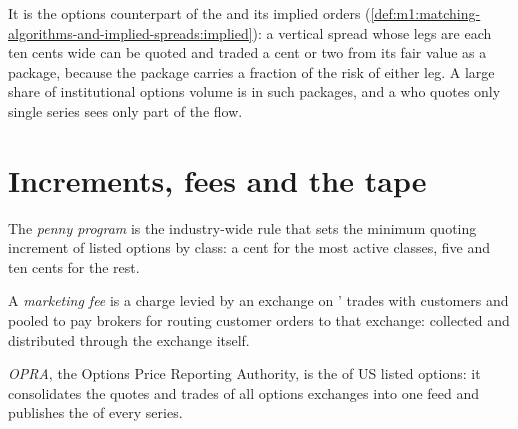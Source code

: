 It is the options counterpart of the  and its implied
orders (\cref{def:m1:matching-algorithms-and-implied-spreads:implied}): a
vertical spread whose legs are each ten cents wide can be quoted and traded a
cent or two from its fair value as a package, because the package carries a
fraction of the risk of either leg. A large share of institutional options
volume is in such packages, and a  who quotes only single series
sees only part of the flow.

\section{Increments, fees and the tape}

\begin{definition}\label{def:m1:options-market-structure:penny}
The \emph{penny program} is the industry-wide rule that
sets the minimum quoting increment of listed options by class: a cent for
the most active classes, five and ten cents for the rest.
\end{definition}

\begin{definition}\label{def:m1:options-market-structure:marketing}
A \emph{marketing fee} is a charge levied by an exchange
on ' trades with customers and pooled to pay brokers for
routing customer orders to that exchange:  collected
and distributed through the exchange itself.
\end{definition}

\begin{definition}[OPRA]\label{def:m1:options-market-structure:opra}
\emph{OPRA}, the Options Price Reporting Authority, is the
 of US listed options: it consolidates the
quotes and trades of all options exchanges into one feed and publishes the
 of every series.
\end{definition}

